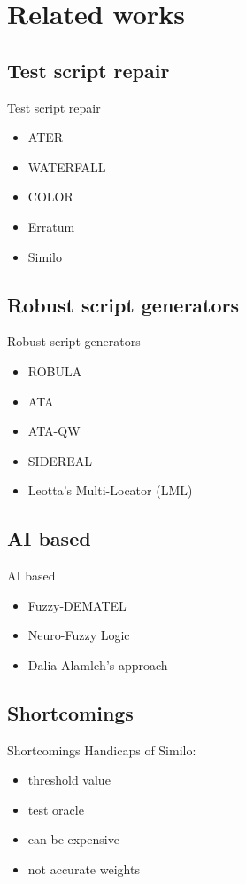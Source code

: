\documentclass{beamer}
\begin{document}
\section{Related works}

\subsection{Test script repair}
\begin{frame}{Test script repair}
\begin{itemize}
    \item ATER
    \item WATERFALL
    \item COLOR
    \item Erratum
    \item Similo
\end{itemize}
\end{frame}

\subsection{Robust script generators}
\begin{frame}{Robust script generators}
\begin{itemize}
    \item ROBULA
    \item ATA
    \item ATA-QW
    \item SIDEREAL
    \item Leotta's Multi-Locator (LML)
\end{itemize}
\end{frame}

\subsection{AI based}
\begin{frame}{AI based}
\begin{itemize}
    \item Fuzzy-DEMATEL
    \item Neuro-Fuzzy Logic
    \item Dalia Alamleh's approach
\end{itemize}
\end{frame}

\subsection{Shortcomings}
\begin{frame}{Shortcomings}
Handicaps of Similo:
\begin{itemize}
    \item threshold value
    \item test oracle
    \item can be expensive
    \item not accurate weights
\end{itemize}
\end{frame}
\end{document}
